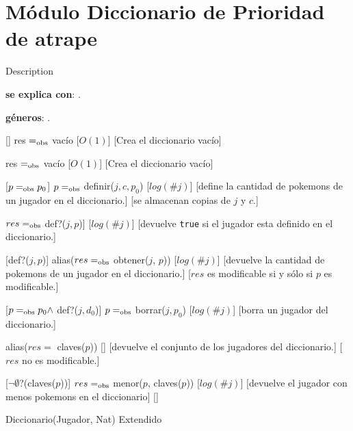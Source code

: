 \section{Módulo Diccionario de Prioridad de atrape}
	Description %

\begin{Interfaz}
	\textbf{se explica con}: . 

	\textbf{géneros}: .


	[]
	{res $=_{\mathrm{obs}}$ vacío}
	[$O(1)$]
	[Crea el diccionario vacío]


	{res $=_{\mathrm{obs}}$ vacío}
	[$O(1)$]
	[Crea el diccionario vacío]

	[$p =_{\mathrm{obs}} p_0$]
	{$p =_{\mathrm{obs}}$ definir($j, c, p_0$)}
	[$log(\#j)$]
	[define la cantidad de pokemons de un jugador en el diccionario.]
	[se almacenan copias de $j$ y $c$.]

	{$res =_{\mathrm{obs}}$ def?($j, p$)]}
	[$log(\#j)$]
	[devuelve \texttt{true} si el jugador esta definido en el diccionario.]

	[def?($j, p$)]
	{alias($res =_{\mathrm{obs}}$ obtener($j$, $p$))}
	[$log(\#j)$]
	[devuelve la cantidad de pokemons de un jugador en el diccionario.]
	[$res$ es modificable si y sólo si $p$ es modificable.]

	[$p =_{\mathrm{obs}} p_0 \land$ def?($j, d_0$)]
	{$p =_{\mathrm{obs}}$ borrar($j, p_0$)}
	[$log(\#j)$]
	[borra un jugador del diccionario.]

	{alias($res =$ claves($p$))}
	[]%
	[devuelve el conjunto de los jugadores del diccionario.]
	[$res$ no es modificable.]

	[$\neg\emptyset$?(claves($p$))]
	{$res =_{\mathrm{obs}}$ menor($p$, claves($p$))}
	[$log(\#j)$]
	[devuelve el jugador con menos pokemons en el diccionario]
	[]


  \begin{tad}{Diccionario(Jugador, Nat) Extendido}
    \parskip=0pt
    
    \tadAxiomas
  \end{tad}

\end{Interfaz}



